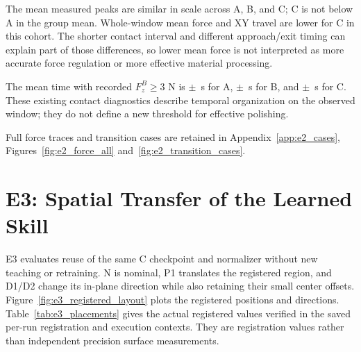 The mean measured peaks are similar in scale across A, B, and C; C is not below A in the group mean. Whole-window mean force and XY travel are lower for C in this cohort. The shorter contact interval and different approach/exit timing can explain part of those differences, so lower mean force is not interpreted as more accurate force regulation or more effective material processing.

The mean time with recorded \(F_z^B\geq3\) N is \EtwoAContactTime\(\pm\)\EtwoAContactTimeSD~s for A, \EtwoBContactTime\(\pm\)\EtwoBContactTimeSD~s for B, and \EtwoCContactTime\(\pm\)\EtwoCContactTimeSD~s for C. These existing contact diagnostics describe temporal organization on the observed window; they do not define a new threshold for effective polishing.

Full force traces and transition cases are retained in Appendix~\ref{app:e2_cases}, Figures~\ref{fig:e2_force_all} and~\ref{fig:e2_transition_cases}.


\FloatBarrier
\section{E3: Spatial Transfer of the Learned Skill}
\label{sec:e3_results}
E3 evaluates reuse of the same C checkpoint and normalizer without new teaching or retraining. N is nominal, P1 translates the registered region, and D1/D2 change its in-plane direction while also retaining their small center offsets. Figure~\ref{fig:e3_registered_layout} plots the registered positions and directions. Table~\ref{tab:e3_placements} gives the actual registered values verified in the saved per-run registration and execution contexts. They are registration values rather than independent precision surface measurements.

\begin{table}[H]\centering\small
\caption[E3 actual registered placements]{Main E3 conditions: registered offsets from nominal and direction change. D1/D2 include the listed center shifts. Each value is consistent across the five selected run contexts for its condition.}
\label{tab:e3_placements}
\end{table}


